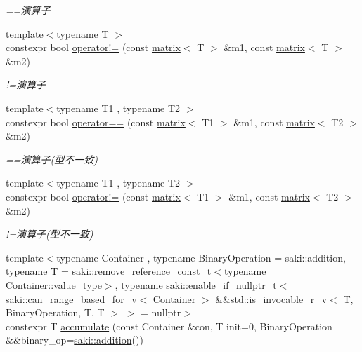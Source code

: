 \begin{DoxyCompactItemize}
\begin{DoxyCompactList}\small\item\em ==演算子 \end{DoxyCompactList}\item 
{\footnotesize template$<$typename T $>$ }\\constexpr bool \mbox{\hyperlink{namespacesaki_a76722addb100e11d9eb9370ced3b027c}{operator!=}} (const \mbox{\hyperlink{classsaki_1_1matrix}{matrix}}$<$ T $>$ \&m1, const \mbox{\hyperlink{classsaki_1_1matrix}{matrix}}$<$ T $>$ \&m2)
\begin{DoxyCompactList}\small\item\em !=演算子 \end{DoxyCompactList}\item 
{\footnotesize template$<$typename T1 , typename T2 $>$ }\\constexpr bool \mbox{\hyperlink{namespacesaki_a1ffbf8122dda5209dc384e64747bec32}{operator==}} (const \mbox{\hyperlink{classsaki_1_1matrix}{matrix}}$<$ T1 $>$ \&m1, const \mbox{\hyperlink{classsaki_1_1matrix}{matrix}}$<$ T2 $>$ \&m2)
\begin{DoxyCompactList}\small\item\em ==演算子(型不一致) \end{DoxyCompactList}\item 
{\footnotesize template$<$typename T1 , typename T2 $>$ }\\constexpr bool \mbox{\hyperlink{namespacesaki_a4bef07cf55a40a115c89e6e20406b124}{operator!=}} (const \mbox{\hyperlink{classsaki_1_1matrix}{matrix}}$<$ T1 $>$ \&m1, const \mbox{\hyperlink{classsaki_1_1matrix}{matrix}}$<$ T2 $>$ \&m2)
\begin{DoxyCompactList}\small\item\em !=演算子(型不一致) \end{DoxyCompactList}\item 
{\footnotesize template$<$typename Container , typename Binary\+Operation  = saki\+::addition, typename T  = saki\+::remove\+\_\+reference\+\_\+const\+\_\+t$<$typename Container\+::value\+\_\+type$>$, typename saki\+::enable\+\_\+if\+\_\+nullptr\+\_\+t$<$ saki\+::can\+\_\+range\+\_\+based\+\_\+for\+\_\+v$<$ Container $>$ \&\&std\+::is\+\_\+invocable\+\_\+r\+\_\+v$<$ T, Binary\+Operation, T, T $>$ $>$  = nullptr$>$ }\\constexpr T \mbox{\hyperlink{namespacesaki_a6f2ea69ef5e31c8004ba36bb10384333}{accumulate}} (const Container \&con, T init=0, Binary\+Operation \&\&binary\+\_\+op=\mbox{\hyperlink{structsaki_1_1addition}{saki\+::addition}}())

\end{DoxyCompactItemize}
